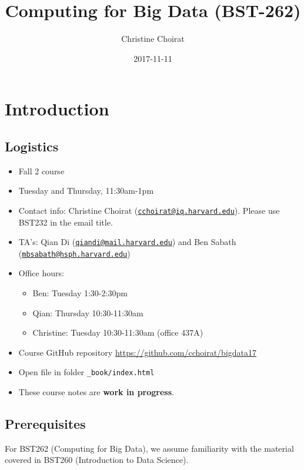 \documentclass[]{book}
\title{Computing for Big Data (BST-262)}
\author{Christine Choirat}
\date{2017-11-11}
\providecommand{\tightlist}{%
  \setlength{\itemsep}{0pt}\setlength{\parskip}{0pt}}
\theoremstyle{definition}
\theoremstyle{definition}
\theoremstyle{definition}
\theoremstyle{remark}
\begin{document}
\maketitle

{
\setcounter{tocdepth}{1}
\tableofcontents
}
\chapter{Introduction}\label{intro}

\section{Logistics}\label{logistics}

\begin{itemize}
\tightlist
\item
  Fall 2 course
\item
  Tuesday and Thursday, 11:30am-1pm
\item
  Contact info: Christine Choirat
  (\href{mailto:cchoirat@iq.harvard.edu}{\nolinkurl{cchoirat@iq.harvard.edu}}).
  Please use BST232 in the email title.
\item
  TA's: Qian Di
  (\href{mailto:qiandi@mail.harvard.edu}{\nolinkurl{qiandi@mail.harvard.edu}})
  and Ben Sabath
  (\href{mailto:mbsabath@hsph.harvard.edu}{\nolinkurl{mbsabath@hsph.harvard.edu}})
\item
  Office hours:

  \begin{itemize}
  \tightlist
  \item
    Ben: Tuesday 1:30-2:30pm
  \item
    Qian: Thursday 10:30-11:30am
  \item
    Christine: Tuesday 10:30-11:30am (office 437A)
  \end{itemize}
\item
  Course GitHub repository \url{https://github.com/cchoirat/bigdata17}
\item
  Open file in folder \texttt{\_book/index.html}
\item
  These course notes are \textbf{work in progress}.
\end{itemize}

\section{Prerequisites}\label{prerequisites}

For BST262 (Computing for Big Data), we assume familiarity with the
material covered in BST260 (Introduction to Data Science).
\end{document}
